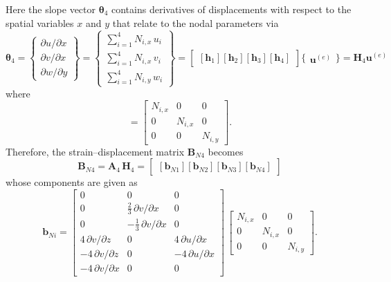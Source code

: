 Here the slope vector $\boldsymbol{\theta}_4$ contains derivatives of displacements with respect to the spatial variables $x$ and $y$ that relate to the nodal parameters via
\small
\begin{equation}
	\boldsymbol{\theta}_4 =  \begin{Bmatrix}
		\partial u / \partial x\\
		\partial v / \partial x \\
		\partial w / \partial y
	\end{Bmatrix}
	= \begin{Bmatrix}
		\sum\nolimits_{i=1}^4 N_{i,x} \, u_i\\
		\sum\nolimits_{i=1}^4 N_{i,x} \, v_i \\
		\sum\nolimits_{i=1}^4 N_{i,y} \, w_i
	\end{Bmatrix} 
	= \begin{bmatrix}
		[\mathbf{h}_1] [\mathbf{h}_2] [\mathbf{h}_3] [\mathbf{h}_4] 
	\end{bmatrix} \bigl\{ \begin{matrix} \mathbf{u}^{(e)} \end{matrix} \bigr\}
	= \mathbf{H}_4  \mathbf{u}^{(e)} 
\end{equation}
\normalsize
where 
\begin{equation}
	[\mathbf{h}_i] = \begin{bmatrix}
		N_{i,x} &  0 & 0  \\
		0 & N_{i,x} & 0  \\
		0 & 0 & N_{i,y} \end{bmatrix} . 
\end{equation}
Therefore, the strain--displacement matrix $\mathbf{B}_{N4}$ becomes
\begin{equation}
	\mathbf{B}_{N4} = \mathbf{A}_4 \, \mathbf{H}_4 = \begin{bmatrix}
		[\mathbf{b}_{N1}] [\mathbf{b}_{N2}] [\mathbf{b}_{N3}] [\mathbf{b}_{N4}]
	\end{bmatrix} 
\end{equation}
whose components are given as
\begin{equation}
	\mathbf{b}_{Ni} = \begin{bmatrix}
		0 & 0 &  0   \\
		0 &  \tfrac{2}{3} \, \partial v / \partial x & 0  \\
		0 &  - \tfrac{1}{3} \, \partial v / \partial x & 0 \\
		4 \, \partial v / \partial z &  0 & 4 \, \partial u / \partial x  \\
		-4 \,\partial v / \partial z &  0 & -4 \,\partial u / \partial x  \\
		-4 \,\partial v / \partial x &  0 & 0  \end{bmatrix} \, \begin{bmatrix}
		N_{i,x} &  0 & 0  \\
		0 & N_{i,x} & 0  \\
		0 & 0 & N_{i,y}  \end{bmatrix}.
\end{equation}

